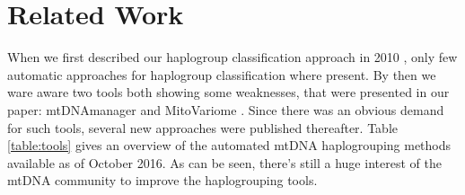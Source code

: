 \section{Related Work}\label{hg:related}
When we first described our haplogroup classification approach in 2010 \cite{Kloss-Brandstatter2011}, only few automatic approaches for haplogroup classification where present. By then we ware aware two tools both showing some weaknesses, that were presented in our paper: mtDNAmanager \cite{Lee2008}  and MitoVariome \cite{Lee2009}. Since there was an obvious demand for such tools, several new approaches were published thereafter. Table \ref{table:tools} gives an overview of the automated mtDNA haplogrouping methods available as of October 2016. As can be seen, there's still a huge interest of the mtDNA community to improve the haplogrouping tools. 

